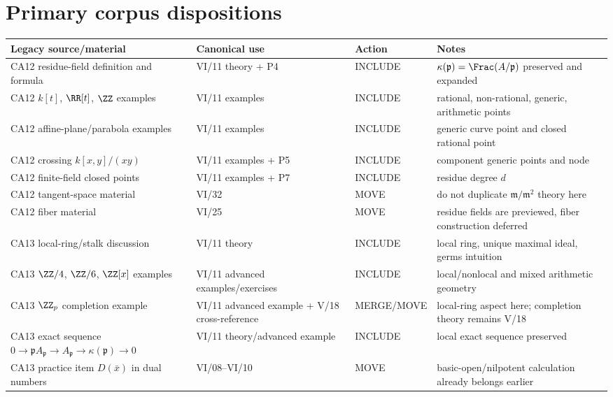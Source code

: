 \section*{Primary corpus dispositions}
\begin{center}
\small
\renewcommand{\arraystretch}{1.18}
\begin{tabular}{p{}p{}p{}p{}}
\toprule
Legacy source/material & Canonical use & Action & Notes\\
\midrule
CA12 residue-field definition and formula & VI/11 theory + P4 & INCLUDE & $\kappa(\mathfrak p)=\Frac(A/\mathfrak p)$ preserved and expanded\\
CA12 $k[t]$, $\RR[t]$, $\ZZ$ examples & VI/11 examples & INCLUDE & rational, non-rational, generic, arithmetic points\\
CA12 affine-plane/parabola examples & VI/11 examples & INCLUDE & generic curve point and closed rational point\\
CA12 crossing $k[x,y]/(xy)$ & VI/11 examples + P5 & INCLUDE & component generic points and node\\
CA12 finite-field closed points & VI/11 examples + P7 & INCLUDE & residue degree $d$\\
CA12 tangent-space material & VI/32 & MOVE & do not duplicate $\mathfrak m/\mathfrak m^2$ theory here\\
CA12 fiber material & VI/25 & MOVE & residue fields are previewed, fiber construction deferred\\
CA13 local-ring/stalk discussion & VI/11 theory & INCLUDE & local ring, unique maximal ideal, germs intuition\\
CA13 $\ZZ/4$, $\ZZ/6$, $\ZZ[x]$ examples & VI/11 advanced examples/exercises & INCLUDE & local/nonlocal and mixed arithmetic geometry\\
CA13 $\ZZ_p$ completion example & VI/11 advanced example + V/18 cross-reference & MERGE/MOVE & local-ring aspect here; completion theory remains V/18\\
CA13 exact sequence $0\to\mathfrak pA_{\mathfrak p}\to A_{\mathfrak p}\to\kappa(\mathfrak p)\to0$ & VI/11 theory/advanced example & INCLUDE & local exact sequence preserved\\
CA13 practice item $D(\bar x)$ in dual numbers & VI/08--VI/10 & MOVE & basic-open/nilpotent calculation already belongs earlier\\
\bottomrule
\end{tabular}
\end{center}

